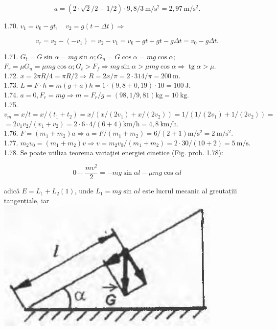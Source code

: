 \documentclass[10pt]{article}
\begin{document}
$$
a=(2 \cdot \sqrt{2} / 2-1 / 2) \cdot 9,8 / 3 \mathrm{~m} / \mathrm{s}^{2}=2,97 \mathrm{~m} / \mathrm{s}^{2} .
$$

1.70. $v_{1}=v_{0}-g t, \quad v_{2}=g(t-\Delta t) \Rightarrow$

$$
v_{r}=v_{2}-\left(-v_{1}\right)=v_{2}-v_{1}=v_{0}-g t+g t-g \Delta t=v_{0}-g \Delta t .
$$

1.71. $G_{t}=G \sin \alpha=m g \sin \alpha ; G_{n}=G \cos \alpha=m g \cos \alpha$;\\
$F_{r}=\mu G_{n}=\mu m g \cos \alpha ; G_{t}>F_{f} \Rightarrow m g \sin \alpha>\mu m g \cos \alpha \Rightarrow \operatorname{tg} \alpha>\mu$.\\
1.72. $x=2 \pi R / 4=\pi R / 2 \Rightarrow R=2 x / \pi=2 \cdot 314 / \pi=200 \mathrm{~m}$.\\
1.73. $L=F \cdot h=m(g+a) h=1 \cdot(9,8+0,19) \cdot 10=100 \mathrm{~J}$.\\
1.74. $a=0, F_{r}=m g \Rightarrow m=F_{r} / g=(98,1 / 9,81) \mathrm{kg}=10 \mathrm{~kg}$.\\
1.75. $v_{m}=x / t=x /\left(t_{1}+t_{2}\right)=x /\left(x /\left(2 v_{1}\right)+x /\left(2 v_{2}\right)\right)=1 /\left(1 /\left(2 v_{1}\right)+1 /\left(2 v_{2}\right)\right)=$ $=2 v_{1} v_{2} /\left(v_{1}+v_{2}\right)=2 \cdot 6 \cdot 4 /(6+4) \mathrm{km} / \mathrm{h}=4,8 \mathrm{~km} / \mathrm{h}$.\\
1.76. $F=\left(m_{1}+m_{2}\right) a \Rightarrow a=F /\left(m_{1}+m_{2}\right)=6 /(2+1) \mathrm{m} / \mathrm{s}^{2}=2 \mathrm{~m} / \mathrm{s}^{2}$.\\
1.77. $m_{2} v_{0}=\left(m_{1}+m_{2}\right) v \Rightarrow v=m_{2} v_{0} /\left(m_{1}+m_{2}\right)=2 \cdot 30 /(10+2)=5 \mathrm{~m} / \mathrm{s}$.\\
1.78. Se poate utiliza teorema variaţiei energiei cinetice (Fig. prob. 1.78):

$$
0-\frac{m v^{2}}{2}=-m g \sin \alpha l-\mu m g \cos \alpha l
$$

adicǎ $E=L_{1}+L_{2}(1)$, unde $L_{1}=m g \sin \alpha l$ este lucrul mecanic al greutațiii tangențiale, iar\\
\includegraphics[max width=\textwidth, center]{2025_07_01_5b3ff9fa0d508c8e9f17g-213}
\end{document}

